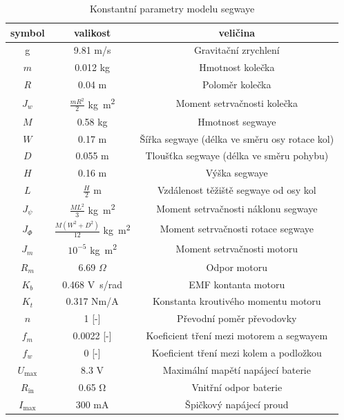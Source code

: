 \documentclass[conference]{IEEEtran}
\begin{document}
\begin{table}[htbp]
    \centering
    \begin{tabular}[t]{|c|c|c|}
        \hline
        symbol & valikost & veličina \\\hline
        g  & 9.81 \si{m/s} & Gravitační zrychlení \\\hline
        $ m $ & 0.012 \si{kg} & Hmotnost kolečka \\\hline
        $ R $ & 0.04 \si{m }& Poloměr kolečka \\\hline
        $ J_w $ & $\frac{mR^2}{2}$ \si{kg . m^2} & Moment setrvačnosti kolečka \\\hline
        $ M $ & 0.58   \si{kg} & Hmotnost segwaye \\\hline
        $ W $ & 0.17  \si{ m} & Šířka segwaye (délka ve směru osy rotace kol) \\\hline
        $ D $ & 0.055  \si{ m} & Tloušťka segwaye (délka ve směru pohybu) \\\hline
        $ H $ & 0.16 \si{m }& Výška  segwaye \\\hline
        $ L $ & $\frac{H}{2}$ \si{m} & Vzdálenost těžiště segwaye od osy kol \\\hline
        $ J_\psi $ & $\frac{ML^2}{3}$ \si{kg . m^2} & Moment setrvačnosti náklonu segwaye\\\hline
        $ J_\varPhi $ & $\frac{M(W^2 + D^2)}{12}$ \si{kg . m^2} & Moment setrvačnosti rotace segwaye \\\hline
        $ J_m $ & $10^{-5}$ \si{kg . m^2} & Moment setrvačnosti motoru \\\hline
        $ R_m $ & 6.69 $\Omega$ & Odpor motoru \\\hline
        $ K_b $ & 0.468 \si{V.s/rad} & EMF kontanta motoru \\\hline
        $ K_t $ & 0.317 \si{Nm/A} & Konstanta kroutivého momentu motoru \\\hline
        $ n $ & 1 [-] & Převodní poměr převodovky \\\hline
        $ f_m $ & 0.0022 [-] & Koeficient tření mezi motorem a segwayem \\\hline
        $ f_w $ & 0 [-] & Koeficient tření mezi kolem a podložkou \\\hline
        $ U_\text{max} $ & 8.3 \si{V} & Maximální mapětí napájecí baterie \\\hline
        $ R_\text{in} $ & 0.65 \si{\ohm} & Vnitřní odpor baterie \\\hline
        $ I_\text{max} $ & 300 \si{\milli\ampere} & Špičkový napájecí proud \\\hline
        
    \end{tabular}
    \caption{Konstantní parametry modelu segwaye}
    \label{tab:konstanty}
\end{table}
\end{document}
